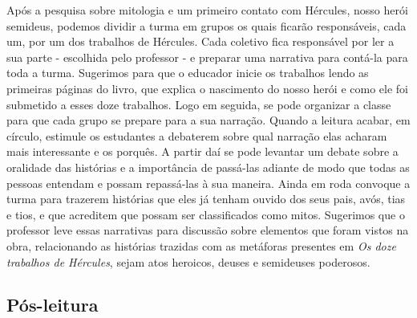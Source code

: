 \documentclass[11pt]{extarticle}
\begin{document}
Após a pesquisa sobre mitologia e um primeiro contato com Hércules, nosso herói semideus, podemos dividir a turma em grupos os quais ficarão responsáveis, cada um, por um dos trabalhos de Hércules. Cada coletivo fica responsável por ler a sua parte - escolhida pelo professor - e preparar uma narrativa para contá-la para toda a turma. Sugerimos para que o educador inicie os trabalhos lendo as primeiras páginas do livro, que explica o nascimento do nosso herói e como ele foi submetido a esses doze trabalhos. Logo em seguida, se pode organizar a classe para que cada grupo se prepare para a sua narração. Quando a leitura acabar, em círculo, estimule os estudantes a debaterem sobre qual narração elas acharam mais interessante e os porquês. A partir daí se pode levantar um debate sobre a oralidade das histórias e a importância de passá-las adiante de modo que todas as pessoas entendam e possam repassá-las à sua maneira. Ainda em roda convoque a turma para trazerem histórias que eles já tenham ouvido dos seus pais, avós, tias e tios, e que acreditem que possam ser classificados como mitos. Sugerimos que o professor leve essas narrativas para discussão sobre elementos que foram vistos na obra, relacionando as histórias trazidas com as metáforas presentes em \textit{Os doze trabalhos de Hércules}, sejam atos heroicos, deuses e semideuses poderosos. 



\subsection{Pós-leitura}

\end{document}
